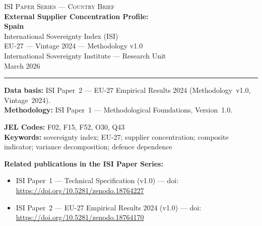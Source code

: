 \documentclass[12pt,a4paper]{article}
\begin{document}
\hypersetup{pageanchor=false}

\begin{titlepage}
\centering
\vspace*{2cm}
{\Large\textsc{ISI Paper Series --- Country Brief}}\\[1.2cm]
{\LARGE\bfseries External Supplier Concentration Profile:\\[0.3em]
Spain}\\[1.5cm]
{\large International Sovereignty Index (ISI)\\[0.3em]
EU-27 --- Vintage 2024 --- Methodology v1.0}\\[1.2cm]
{\large International Sovereignty Institute --- Research Unit}\\[0.8cm]
{\large March 2026}

\vspace{0.8cm}
\noindent\rule{\textwidth}{0.4pt}
\vspace{0.4cm}

\begin{flushleft}
\noindent\textbf{Data basis:} ISI Paper~2 --- EU-27 Empirical Results 2024 (Methodology~v1.0, Vintage~2024).\\[4pt]
\noindent\textbf{Methodology:} ISI Paper~1 --- Methodological Foundations, Version~1.0.

\medskip

\noindent\textbf{JEL Codes:} F02, F15, F52, O30, Q43\\[4pt]
\noindent\textbf{Keywords:} sovereignty index; EU-27; supplier concentration; composite indicator; variance decomposition; defence dependence

\medskip

\noindent\textbf{Related publications in the ISI Paper Series:}
\begin{itemize}[nosep,leftmargin=1.5em]
\item ISI Paper~1 --- Technical Specification (v1.0) --- doi:\\
  \url{https://doi.org/10.5281/zenodo.18764227}
\item ISI Paper~2 --- EU-27 Empirical Results 2024 (v1.0) --- doi:\\
  \url{https://doi.org/10.5281/zenodo.18764170}
\end{itemize}
\end{flushleft}
\vfill
\end{titlepage}
\end{document}

